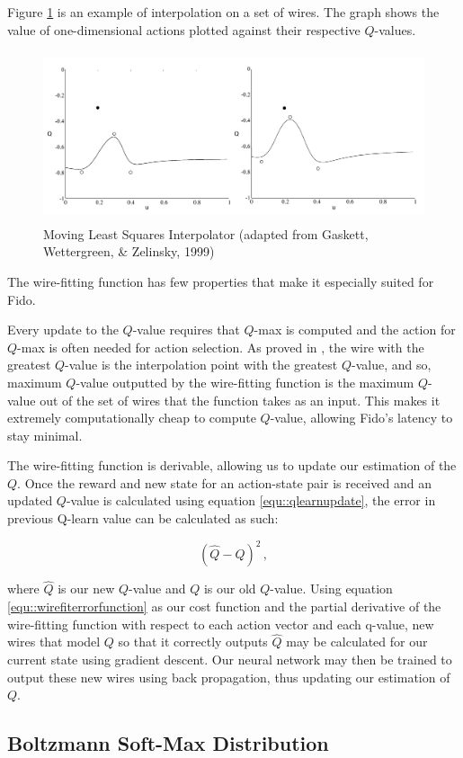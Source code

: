 Figure \ref{fig::wirefitexample} is an example of interpolation on a set of wires. The graph shows the value of one-dimensional actions plotted against their respective $Q$-values.

\begin{figure}[ht]
    \centering
    \includegraphics[height=5cm]{Figures/WireFit.png}
	\caption{Moving Least Squares Interpolator (adapted from Gaskett, Wettergreen, \& Zelinsky, 1999)}
    \label{fig::wirefitexample}
\end{figure}

The wire-fitting function has few properties that make it especially suited for Fido.

Every update to the $Q$-value requires that $Q$-max is computed and the action for $Q$-max is often needed for action selection. As proved in \cite{baird}, the wire with the greatest $Q$-value is the interpolation point with the greatest $Q$-value, and so, maximum $Q$-value outputted by the wire-fitting function is the maximum $Q$-value out of the set of wires that the function takes as an input. This makes it extremely computationally cheap to compute $Q$-value, allowing Fido's latency to stay minimal.

The wire-fitting function is derivable, allowing us to update our estimation of the $Q$. Once the reward and new state for an action-state pair is received and an updated $Q$-value is calculated using equation \ref{equ::qlearnupdate}, the error in previous Q-learn value can be calculated as such:

\begin{equation}
	(\hat{Q} - Q)^2
	\,,
	\label{equ::wirefiterrorfunction}
\end{equation}

where $\hat{Q}$ is our new $Q$-value and $Q$ is our old $Q$-value. Using equation \ref{equ::wirefiterrorfunction} as our cost function and the partial derivative of the wire-fitting function with respect to each action vector and each q-value, new wires that model $Q$ so that it correctly outputs $\hat{Q}$ may be calculated for our current state using gradient descent. Our neural network may then be trained to output these new wires using back propagation, thus updating our estimation of $Q$.

\subsection{Boltzmann Soft-Max Distribution}

